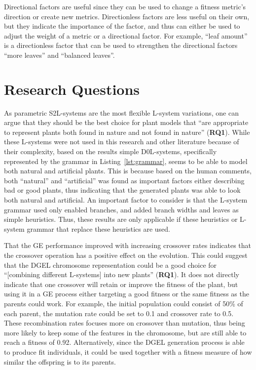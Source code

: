 Directional factors are useful since they can be used to change a fitness metric's direction or create new metrics.
Directionless factors are less useful on their own, but they indicate the importance of the factor, and thus can either be used to adjust the weight of a metric or a directional factor.
For example, ``leaf amount'' is a directionless factor that can be used to strengthen the directional factors ``more leaves'' and ``balanced leaves''.

\section{Research Questions}
As parametric S2L-systems are the most flexible L-system variations, one can argue that they should be the best choice for plant models that ``are appropriate to represent plants both found in nature and not found in nature'' (\textbf{RQ1}).
While these L-systems were not used in this research and other literature because of their complexity, based on the results simple D0L-systems, specifically represented by the grammar in Listing~\ref{lst:grammar}, seems to be able to model both natural and artificial plants.
This is because based on the human comments, both ``natural'' and ``artificial'' was found as important factors either describing bad or good plants, thus indicating that the generated plants was able to look both natural and artificial.
An important factor to consider is that the L-system grammar used only enabled branches, and added branch widths and leaves as simple heuristics.
Thus, these results are only applicable if these heuristics or L-system grammar that replace these heuristics are used.

That the GE performance improved with increasing crossover rates indicates that the crossover operation has a positive effect on the evolution.
This could suggest that the DGEL chromosome representation could be a good choice for ``[combining different L-systems] into new plants'' (\textbf{RQ1}).
It does not directly indicate that one crossover will retain or improve the fitness of the plant, but using it in a GE process either targeting a good fitness or the same fitness as the parents could work.
For example, the initial population could consist of 50\% of each parent, the mutation rate could be set to 0.1 and crossover rate to 0.5.
These recombination rates focuses more on crossover than mutation, thus being more likely to keep some of the features in the chromosome, but are still able to reach a fitness of 0.92.
Alternatively, since the DGEL generation process is able to produce fit individuals, it could be used together with a fitness measure of how similar the offspring is to its parents.

